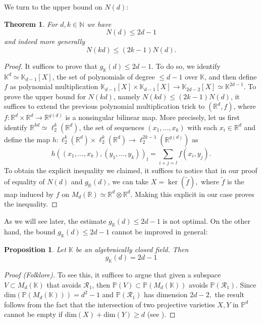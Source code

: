 \documentclass[11pt, a4paper, reqno]{elsarticle}
\newtheorem{theorem}{Theorem}[section]
\newtheorem{proposition}{Proposition}[section]
\theoremstyle{definition}
\theoremstyle{remark}
\begin{document}
We turn to the upper bound on $N(d)$:
\begin{theorem}
For $d, k\in \mathbb{N}$ we have
\begin{equation*}
	N(d)
\le
	2d-1
\end{equation*}
and indeed more generally
\begin{equation*}
	N(kd)
\le
	(2k-1)N(d).
\end{equation*}
\end{theorem}
\begin{proof}
It suffices to prove that $g_{\mathbb K}(d)\le 2d-1$. 
To do so, we identify $\mathbb K^d\simeq \mathbb K_{d-1}[X]$,
the set of polynomials of degree $\le d-1$ over $\mathbb{K}$,
and then define $f$ as polynomial multiplication 
$
	\mathbb K_{d-1}[X]
\times 
	\mathbb K_{d-1}[X]
\to
	\mathbb K_{2d-2}[X]
\simeq
	\mathbb K^{2d-1}$. 
To prove the upper bound for $N(kd)$,
namely $N(kd)\le (2k-1)N(d)$,
it suffices to extend the previous polynomial multiplication trick
 to $(\mathbb{R}^d, f)$, where $f\colon\mathbb{R}^d\times \mathbb{R}^d\to \mathbb{R}^{g(d)}$ is a 
nonsingular bilinear map. 
More precisely, let us first identify 
$\mathbb{R}^{kd}\simeq \ell_2^k(\mathbb{R}^d)$,
the set of sequences
$(x_1,\dots, x_k)$ with each $x_i\in \mathbb{R}^d$
and define the map 
$
	h\colon
	\ell_2^k(\mathbb{R}^d)
\times
	\ell_2^k(\mathbb{R}^d)
\to
	\ell_2^{2k-1}(\mathbb{R}^{g(d)})$
as
\begin{equation*}
	h((x_1,\dots, x_k),(y_1,\dots, y_k))_l
=
	\sum_{i+j=l} f(x_i,y_j). 
\end{equation*}
To obtain the explicit inequality we claimed,
it suffices to notice that in our proof of equality of $N(d)$ and 
$g_{\mathbb{R}}(d)$, we can take $X=\ker(\tilde f),$
where $\tilde f$ is the map induced by $f$ on $M_d(\mathbb{R})
\simeq \mathbb{R}^d\otimes \mathbb{R}^d$. Making this explicit in our
case proves the inequality.
\end{proof}
As we will see later, the estimate $g_{\mathbb{R}}(d)\le 2d-1$ is not optimal.
On the other hand, the bound $g_{\mathbb K}(d)\le 2d-1$
cannot be improved in general:
\begin{proposition}\label{prop : gclosed}
Let $\mathbb K$ be an algebraically closed field. Then
\begin{equation*}
g_{\mathbb K}(d)=2d-1
\end{equation*} 
\end{proposition}
\begin{proof}[Proof (Folklore)]
To see this, it suffices to argue that given a subspace 
$V\subset M_d(\mathbb K)$ that avoids $\mathcal R_1$, then
$\mathbb P(V)\subset \mathbb P(M_d(\mathbb K))$ avoids
$\mathbb P(\mathcal R_1)$.
Since $\mathrm{dim}(\mathbb P(M_d(\mathbb K)))=d^2-1$
and $\mathbb P(\mathcal R_1)$ has dimension $2d-2,$
the result follows from the fact that the intersection
of two projective varieties $X,Y$ in $\mathbb P^d$
cannot be empty if $\mathrm{dim}(X)+\mathrm{dim}(Y)\ge d$
(see \cite[Theorem 7.2]{hartshorne1977ag}).
\end{proof}
\end{document}

